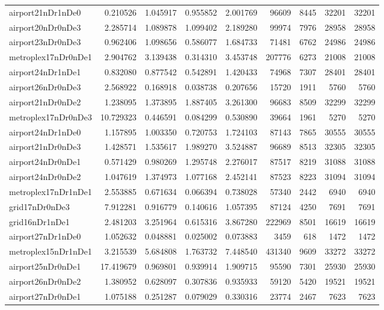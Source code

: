 \begin{longtable}{|l|r|r|r|r|r|r|r|r|}
airport21nDr1nDe0 & 0.210526 & 1.045917 & 0.955852 & 2.001769 & 96609 & 8445 & 32201 & 32201 \\
airport20nDr0nDe3 & 2.285714 & 1.089878 & 1.099402 & 2.189280 & 99974 & 7976 & 28958 & 28958 \\
airport23nDr0nDe3 & 0.962406 & 1.098656 & 0.586077 & 1.684733 & 71481 & 6762 & 24986 & 24986 \\
metroplex17nDr0nDe1 & 2.904762 & 3.139438 & 0.314310 & 3.453748 & 207776 & 6273 & 21008 & 21008 \\
airport24nDr1nDe1 & 0.832080 & 0.877542 & 0.542891 & 1.420433 & 74968 & 7307 & 28401 & 28401 \\
airport26nDr0nDe3 & 2.568922 & 0.168918 & 0.038738 & 0.207656 & 15720 & 1911 & 5760 & 5760 \\
airport21nDr0nDe2 & 1.238095 & 1.373895 & 1.887405 & 3.261300 & 96683 & 8509 & 32299 & 32299 \\
metroplex17nDr0nDe3 & 10.729323 & 0.446591 & 0.084299 & 0.530890 & 39664 & 1961 & 5270 & 5270 \\
airport24nDr1nDe0 & 1.157895 & 1.003350 & 0.720753 & 1.724103 & 87143 & 7865 & 30555 & 30555 \\
airport21nDr0nDe3 & 1.428571 & 1.535617 & 1.989270 & 3.524887 & 96689 & 8513 & 32305 & 32305 \\
airport24nDr0nDe1 & 0.571429 & 0.980269 & 1.295748 & 2.276017 & 87517 & 8219 & 31088 & 31088 \\
airport24nDr0nDe2 & 1.047619 & 1.374973 & 1.077168 & 2.452141 & 87523 & 8223 & 31094 & 31094 \\
metroplex17nDr1nDe1 & 2.553885 & 0.671634 & 0.066394 & 0.738028 & 57340 & 2442 & 6940 & 6940 \\
grid17nDr0nDe3 & 7.912281 & 0.916779 & 0.140616 & 1.057395 & 87124 & 4250 & 7691 & 7691 \\
grid16nDr1nDe1 & 2.481203 & 3.251964 & 0.615316 & 3.867280 & 222969 & 8501 & 16619 & 16619 \\
airport27nDr1nDe0 & 1.052632 & 0.048881 & 0.025002 & 0.073883 & 3459 & 618 & 1472 & 1472 \\
metroplex15nDr1nDe1 & 3.215539 & 5.684808 & 1.763732 & 7.448540 & 431340 & 9609 & 33272 & 33272 \\
airport25nDr0nDe1 & 17.419679 & 0.969801 & 0.939914 & 1.909715 & 95590 & 7301 & 25930 & 25930 \\
airport26nDr0nDe2 & 1.380952 & 0.628097 & 0.307836 & 0.935933 & 59120 & 5420 & 19521 & 19521 \\
airport27nDr0nDe1 & 1.075188 & 0.251287 & 0.079029 & 0.330316 & 23774 & 2467 & 7623 & 7623 \\

\end{longtable}
